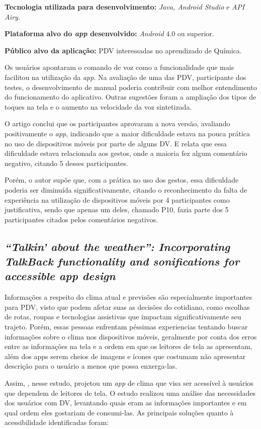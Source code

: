 \textbf{Tecnologia utilizada para desenvolvimento:} \emph{Java, Android Studio} e \emph{API Airy}.

\textbf{Plataforma alvo do \emph{app} desenvolvido:} \emph{Android} 4.0 ou superior.

\textbf{Público alvo da aplicação:} PDV interessadas no aprendizado de Química\@.

Os usuários apontaram o comando de voz como a funcionalidade que mais facilitou na utilização da \emph{app}.
Na avaliação de uma das PDV, participante dos testes, o desenvolvimento de manual poderia contribuir com melhor entendimento do funcionamento do aplicativo.
Outras sugestões foram a ampliação dos tipos de toques na tela e o aumento na velocidade da voz sintetizada.

O artigo conclui que os participantes aprovaram a nova versão, avaliando positivamente o \emph{app}, indicando que a maior dificuldade estava na pouca prática no uso de dispositivos móveis por parte de alguns DV\@.
E relata que essa dificuldade estava relacionada aos gestos, onde a maioria fez algum comentário negativo, citando 5 desses participantes.

Porém, o autor supõe que, com a prática no uso dos gestos, essa dificuldade poderia ser diminuída significativamente, citando o reconhecimento da falta de experiência na utilização de dispositivos móveis por 4 participantes como justificativa, sendo que apenas um deles, chamado P10, fazia parte dos 5 participantes citados pelos comentários negativos.

\subsection{\emph{``Talkin' about the weather'': Incorporating TalkBack functionality and sonifications for accessible app design}}

Informações a respeito do clima atual e previsões são especialmente importantes para PDV, visto que podem afetar suas as decisões do cotidiano, como escolhas de rotas, roupas e tecnologias assistivas que impactam significativamente seu trajeto.
Porém, essas pessoas enfrentam péssimas experiencias tentando buscar informações sobre o clima nos dispositivos móveis, geralmente por conta dos erros entre as informações na tela e a ordem em que os leitores de tela as apresentam, além dos apps serem cheios de imagens e ícones que costumam não apresentar descrição para o usuário a menos que possa enxerga-las.

Assim, , nesse estudo, projetou um \emph{app} de clima que visa ser acessível à usuários que dependem de leitores de tela.
O estudo realizou uma análise das necessidades dos usuários com DV, levantando quais eram as informações importantes e em qual ordem eles gostariam de consumi-las.
As principais soluções quanto à acessibilidade identificadas foram:

